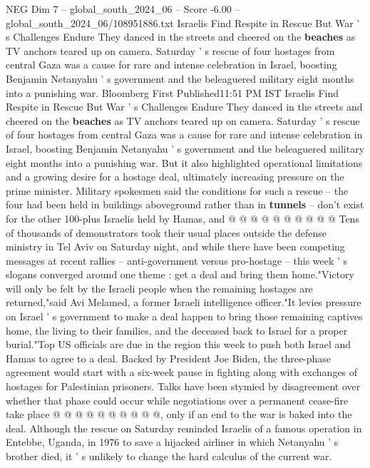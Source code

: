 \begin{textsample}{NEG Dim 7 – global\_south\_2024\_06 – Score -6.00 – global\_south\_2024\_06/108951886.txt}  \label{ex:f7_neg_363}
Israelis Find Respite in Rescue But War ' s Challenges Endure They danced in the streets and cheered on the \textbf{beaches} as TV anchors teared up on camera.
Saturday ' s rescue of four hostages from central Gaza was a cause for rare and intense celebration in Israel, boosting Benjamin Netanyahu ' s government and the beleaguered military eight months into a punishing war.
Bloomberg First Published11:51 PM IST Israelis Find Respite in Rescue But War ' s Challenges Endure They danced in the streets and cheered on the \textbf{beaches} as TV anchors teared up on camera.
Saturday ' s rescue of four hostages from central Gaza was a cause for rare and intense celebration in Israel, boosting Benjamin Netanyahu ' s government and the beleaguered military eight months into a punishing war.
But it also highlighted operational limitations and a growing desire for a hostage deal, ultimately increasing pressure on the prime minister.
Military spokesmen said the conditions for such a rescue -- the four had been held in buildings aboveground rather than in \textbf{tunnels} -- don't exist for the other 100-plus Israelis held by Hamas, and @ @ @ @ @ @ @ @ @ @ Tens of thousands of demonstrators took their usual places outside the defense ministry in Tel Aviv on Saturday night, and while there have been competing messages at recent rallies -- anti-government versus pro-hostage -- this week ' s slogans converged around one theme : get a deal and bring them home."Victory will only be felt by the Israeli people when the remaining hostages are returned,"said Avi Melamed, a former Israeli intelligence officer."It levies pressure on Israel ' s government to make a deal happen to bring those remaining captives home, the living to their families, and the deceased back to Israel for a proper burial."Top US officials are due in the region this week to push both Israel and Hamas to agree to a deal.
Backed by President Joe Biden, the three-phase agreement would start with a six-week pause in fighting along with exchanges of hostages for Palestinian prisoners.
Talks have been stymied by disagreement over whether that phase could occur while negotiations over a permanent cease-fire take place @ @ @ @ @ @ @ @ @ @, only if an end to the war is baked into the deal.
Although the rescue on Saturday reminded Israelis of a famous operation in Entebbe, Uganda, in 1976 to save a hijacked airliner in which Netanyahu ' s brother died, it ' s unlikely to change the hard calculus of the current war.

\end{textsample}
